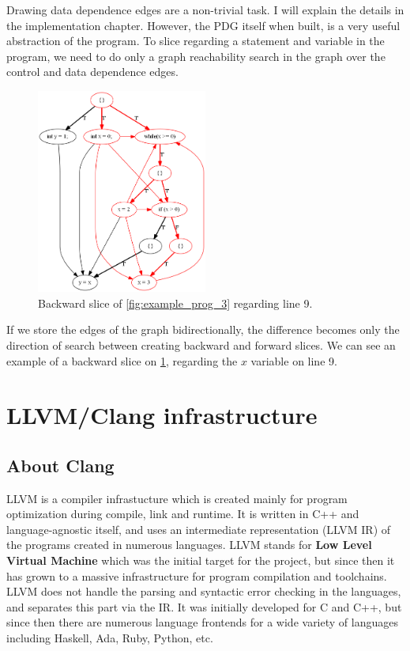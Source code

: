 \documentclass[oneside,12pt,a4paper]{book}
\begin{document}
Drawing data dependence edges are a non-trivial task. I will explain the details in the implementation chapter. However, the PDG itself when built, is a very useful abstraction of the program. To slice regarding a statement and variable in the program, we need to do only a graph reachability search in the graph over the control and data dependence edges. 
\begin{figure}
\includegraphics[width=0.5\textwidth]{loop_carried_test_backward_slice}
\caption{Backward slice of \ref{fig:example_prog_3} regarding line 9.}
\label{fig:example_prog_3_backward_slice}
\end{figure}
If we store the edges of the graph bidirectionally, the difference becomes only the direction of search between creating backward and forward slices. We can see an example of a backward slice on \ref{fig:example_prog_3_backward_slice}, regarding the $x$ variable on line 9.


\chapter{LLVM/Clang infrastructure}
\section{About Clang}

LLVM is a compiler infrastucture which is created mainly for program optimization during compile, link and runtime. It is written in C++ and language-agnostic itself, and uses an intermediate representation (LLVM IR) of the programs created in numerous languages. LLVM stands for \textbf{Low Level Virtual Machine} which was the initial target for the project, but since then it has grown to a massive infrastructure for program compilation and toolchains. LLVM does not handle the parsing and syntactic error checking in the languages, and separates this part via the IR. It was initially developed for C and C++, but since then there are numerous language frontends for a wide variety of languages including Haskell, Ada, Ruby, Python, etc. 
\end{document}
